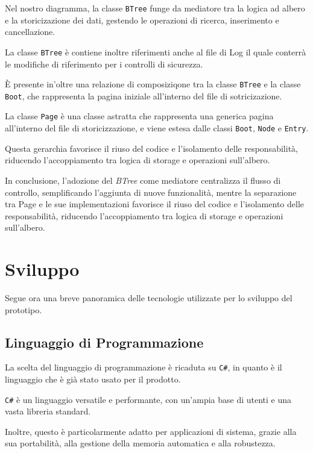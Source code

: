 \documentclass[12pt,a4paper,openright,twoside]{book}
\begin{document}
            Nel nostro diagramma, la classe \texttt{BTree} funge da mediatore tra la logica ad albero e la storicizazione dei dati, gestendo le operazioni di ricerca, inserimento e cancellazione.

            La classe \texttt{BTree} è contiene inoltre riferimenti anche al file di Log il quale conterrà le modifiche di riferimento per i controlli di sicurezza.

            È presente in'oltre una relazione di composiziqone tra la classe \texttt{BTree} e la classe \texttt{Boot}, che rappresenta la pagina iniziale all'interno del file di sotricizazione.

            La classe \texttt{Page} è una classe astratta che rappresenta una generica pagina all'interno del file di storicizzazione, e viene estesa dalle classi \texttt{Boot}, \texttt{Node} e \texttt{Entry}.

            Questa gerarchia favorisce il riuso del codice e l’isolamento delle responsabilità, riducendo l’accoppiamento tra logica di storage e operazioni sull’albero.

            In conclusione, l’adozione del \textit{BTree} come mediatore centralizza il flusso di controllo, semplificando l’aggiunta di nuove funzionalità, mentre la separazione tra Page e le sue implementazioni favorisce il riuso del codice e l’isolamento delle responsabilità, riducendo l’accoppiamento tra logica di storage e operazioni sull’albero.

    \section{Sviluppo}

        Segue ora una breve panoramica delle tecnologie utilizzate per lo sviluppo del prototipo.

        \subsection{Linguaggio di Programmazione}

            La scelta del linguaggio di programmazione è ricaduta su \texttt{C\#}, in quanto è il linguaggio che è già stato usato per il prodotto.

            \texttt{C\#} è un linguaggio versatile e performante, con un'ampia base di utenti e una vasta libreria standard.

            Inoltre, questo è particolarmente adatto per applicazioni di sistema, grazie alla sua portabilità, alla gestione della memoria automatica e alla robustezza.
\end{document}
